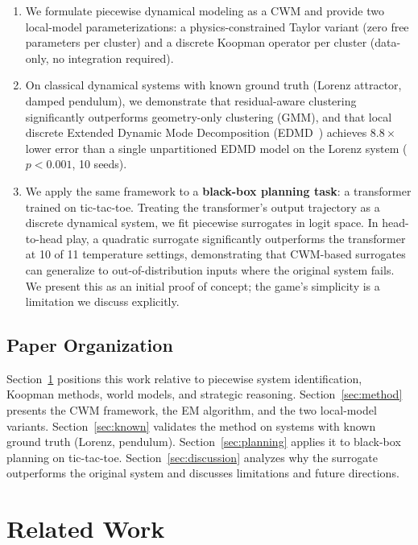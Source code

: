 \documentclass[11pt]{article}
\theoremstyle{definition}
\begin{document}
\begin{enumerate}[leftmargin=*,itemsep=2pt]
  \item We formulate piecewise dynamical modeling as a CWM and provide two local-model parameterizations: a physics-constrained Taylor variant (zero free parameters per cluster) and a discrete Koopman operator per cluster (data-only, no integration required).
  \item On classical dynamical systems with known ground truth (Lorenz attractor, damped pendulum), we demonstrate that residual-aware clustering significantly outperforms geometry-only clustering (GMM), and that local discrete Extended Dynamic Mode Decomposition (EDMD~\cite{williams2015data}) achieves $8.8\times$ lower error than a single unpartitioned EDMD model on the Lorenz system ($p<0.001$, 10 seeds).
  \item We apply the same framework to a \textbf{black-box planning task}: a transformer trained on tic-tac-toe. Treating the transformer's output trajectory as a discrete dynamical system, we fit piecewise surrogates in logit space. In head-to-head play, a quadratic surrogate significantly outperforms the transformer at 10 of 11 temperature settings, demonstrating that CWM-based surrogates can generalize to out-of-distribution inputs where the original system fails. We present this as an initial proof of concept; the game's simplicity is a limitation we discuss explicitly.
\end{enumerate}

\subsection{Paper Organization}

Section~\ref{sec:related} positions this work relative to piecewise system identification, Koopman methods, world models, and strategic reasoning. Section~\ref{sec:method} presents the CWM framework, the EM algorithm, and the two local-model variants. Section~\ref{sec:known} validates the method on systems with known ground truth (Lorenz, pendulum). Section~\ref{sec:planning} applies it to black-box planning on tic-tac-toe. Section~\ref{sec:discussion} analyzes why the surrogate outperforms the original system and discusses limitations and future directions.

\section{Related Work}\label{sec:related}
\end{document}
